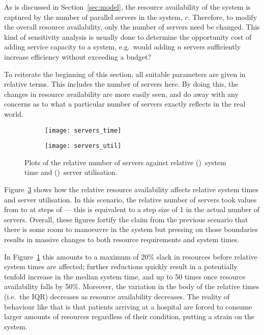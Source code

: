 As is discussed in Section~\ref{sec:model}, the resource availability of the
system is captured by the number of parallel servers in the system, \(c\).
Therefore, to modify the overall resource availability, only the number of
servers need be changed. This kind of sensitivity analysis is usually done to
determine the opportunity cost of adding service capacity to a system, e.g.\
would adding \(n\) servers sufficiently increase efficiency without exceeding
a budget?

To reiterate the beginning of this section, all suitable parameters are given in
relative terms. This includes the number of servers here. By doing this, the
changes in resource availability are more easily seen, and do away with any
concerns as to what a particular number of servers exactly reflects in the real
world.

\begin{figure}
    \centering
    \begin{subfigure}{.5\imgwidth}
        \texttt{[image: servers\_time]}
        \caption{}\label{fig:servers_time}
    \end{subfigure}\hfill%
    \begin{subfigure}{.5\imgwidth}
        \texttt{[image: servers\_util]}
        \caption{}\label{fig:servers_util}
    \end{subfigure}
    \caption{%
        Plots of the relative number of servers against relative
        (\subref{fig:servers_time})~system time and
        ()~server utilisation.
    }\label{fig:servers}
\end{figure}

Figure~\ref{fig:servers} shows how the relative resource availability affects
relative system times and server utilisation. In this scenario, the relative
number of servers took values from  to
 at steps of
 --- this is equivalent to a step size of 1
in the actual number of servers. Overall, these figures fortify the
claim from the previous scenario that there is some room to manoeuvre in the
system but pressing on those boundaries results in massive changes to both
resource requirements and system times.

In Figure~\ref{fig:servers_time} this amounts to a maximum of 20\% slack in
resources before relative system times are affected; further reductions quickly
result in a potentially tenfold increase in the median system time, and up to 50
times once resource availability falls by 50\%. Moreover, the variation in the
body of the relative times (i.e.\ the IQR) decreases as resource availability
decreases. The reality of behaviour like that is that patients arriving at a
hospital are forced to consume larger amounts of resources regardless of their
condition, putting a strain on the system.

